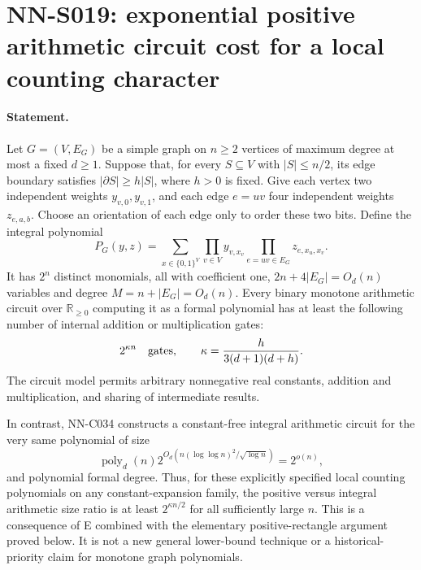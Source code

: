 \section{NN-S019: exponential positive arithmetic circuit cost for a local counting character}

\paragraph{Statement.}
Let $G=(V,E_G)$ be a simple graph on $n\ge2$ vertices of
maximum degree at most a fixed $d\ge1$. Suppose that, for every
$S\subseteq V$ with $|S|\le n/2$, its edge boundary satisfies
$|\partial S|\ge h|S|$, where $h>0$ is fixed.
Give each vertex two independent weights $y_{v,0},y_{v,1}$,
and each edge $e=uv$ four independent weights $z_{e,a,b}$.
Choose an orientation of each edge only to order these two bits.
Define the integral polynomial
\[
 P_G(y,z)=\sum_{x\in\{0,1\}^V}
      \prod_{v\in V}y_{v,x_v}
      \prod_{e=uv\in E_G}z_{e,x_u,x_v}.
\]
It has $2^n$ distinct monomials, all with coefficient one,
$2n+4|E_G|=O_d(n)$ variables and degree
$M=n+|E_G|=O_d(n)$. Every binary monotone arithmetic circuit
over $\mathbb R_{\ge0}$ computing it as a formal polynomial
has at least the following number of internal addition or multiplication gates:
\begin{equation}\label{eq:S019-lower}
 2^{\kappa n}\quad\hbox{gates},\qquad
            \kappa=\frac{h}{3(d+1)(d+h)}.
\end{equation}
The circuit model permits arbitrary nonnegative real constants,
addition and multiplication, and sharing of intermediate results.

In contrast, NN-C034 constructs a constant-free integral arithmetic
circuit for the very same polynomial of size
\[
 \operatorname{poly}_d(n)
 2^{O_d(n(\log\log n)^2/\sqrt{\log n})}=2^{o(n)},
\]
and polynomial formal degree. Thus, for these explicitly specified
local counting polynomials on any constant-expansion family,
the positive versus integral arithmetic size ratio is at least
$2^{\kappa n/2}$ for all sufficiently large $n$.
This is a consequence of E combined with the elementary
positive-rectangle argument proved below. It is not a new
general lower-bound technique or a historical-priority claim
for monotone graph polynomials.

